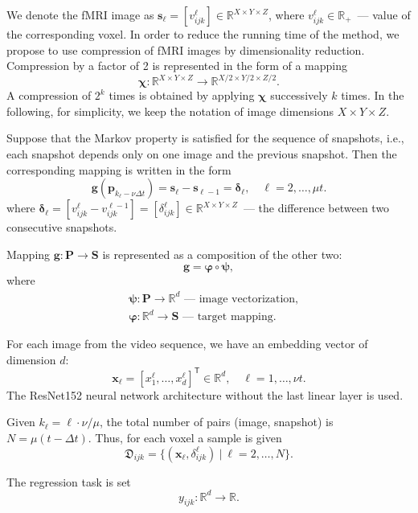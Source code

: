 \documentclass[sn-mathphys-num]{sn-jnl}%
\theoremstyle{thmstyleone}%
\theoremstyle{thmstyletwo}%
\theoremstyle{thmstylethree}%
\newcommand{\T}{^{\mathsf{T}}}
\begin{document}
We denote the fMRI image as $\mathbf{s}_{\ell} = [v^{\ell}_{ijk}] \in \mathbb{R}^{X \times Y \times Z}$, where $v^{\ell}_{ijk} \in \mathbb{R}_+$~--- value of the corresponding voxel. In order to reduce the running time of the method, we propose to use compression of fMRI images by dimensionality reduction. Compression by a factor of 2 is represented in the form of a mapping
\[\boldsymbol{\chi}: \mathbb{R}^{X \times Y \times Z} \to \mathbb{R}^{X/2 \times Y/2 \times Z/2}.\]
A compression of $2^k$ times is obtained by applying $\boldsymbol{\chi}$ successively $k$ times.  In the following, for simplicity, we keep the notation of image dimensions $X \times Y \times Z$.

Suppose that the Markov property is satisfied for the sequence of snapshots, i.e., each snapshot depends only on one image and the previous snapshot. Then the corresponding mapping is written in the form
\begin{equation*}
	\label{eq5}
	\mathbf{g}(\mathbf{p}_{k_{\ell} - \nu \Delta t}) = \mathbf{s}_{\ell} - \mathbf{s}_{\ell-1} = \boldsymbol{\delta}_{\ell}, \quad \ell = 2, \ldots, \mu t.
\end{equation*}
where $\boldsymbol{\delta}_{\ell} = [v^{\ell}_{ijk} - v^{\ell-1}_{ijk}] = [\delta^{\ell}_{ijk}] \in \mathbb{R}^{X \times Y \times Z}$~--- the difference between two consecutive snapshots.

Mapping $\mathbf{g}: \mathbf{P} \to \mathbf{S}$ is represented as a composition of the other two:
\[ \mathbf{g} = \boldsymbol{\varphi} \circ \boldsymbol{\psi}, \]
where
\begin{align*}
	 & \boldsymbol{\psi}: \mathbf{P} \to \mathbb{R}^d
	\text{~--- image vectorization,}        \\
	 & \boldsymbol{\varphi}: \mathbb{R}^d \to \mathbf{S}
	\text{~--- target mapping.}
\end{align*}

For each image from the video sequence, we have an embedding vector of dimension $d$:
\[ \mathbf{x}_{\ell} = [x^{\ell}_1, \ldots, x^{\ell}_{d}]\T \in \mathbb{R}^{d}, \quad {\ell} = 1, \ldots, \nu t. \]
The ResNet152 neural network architecture without the last linear layer is used.

Given $k_{\ell} = \ell \cdot \nu / \mu$, the total number of pairs (image, snapshot) is $N = \mu (t - \Delta t)$. Thus, for each voxel a sample is given
\[ \mathfrak{D}_{ijk} = \{(\mathbf{x}_{\ell}, \delta^{\ell}_{ijk}) \ | \ {\ell} = 2, \ldots, N \}. \]

The regression task is set
\begin{equation*}
	\label{eq6}
	y_{ijk}: \mathbb{R}^{d} \to \mathbb{R}.
\end{equation*}
\end{document}
